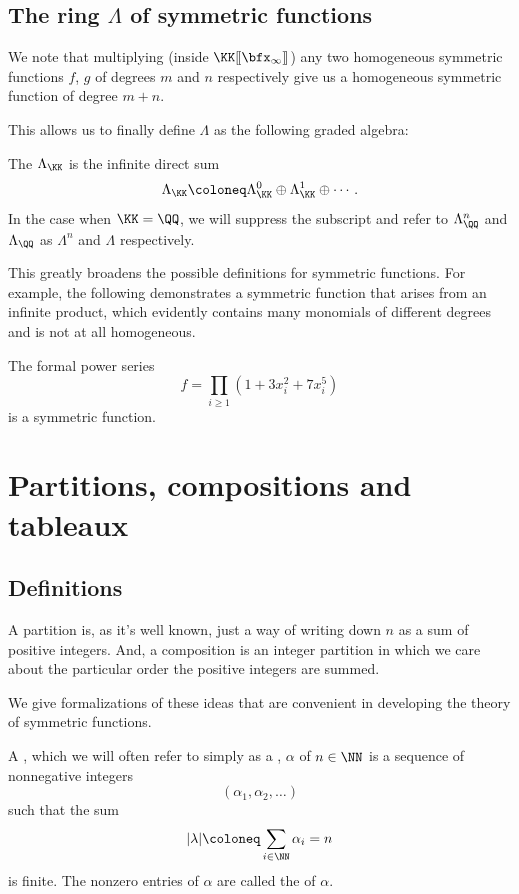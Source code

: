 \documentclass{article}
\newcommand{\lrBrack}[1]{[\kern-1.2pt[ {#1} ]\kern-1.2pt]}
\newcommand{\fps}[2]{#1 \lrBrack{#2}}
\begin{document}
\subsection{The ring \texorpdfstring{$\Lambda$}{Λ} of symmetric functions}

We note that multiplying (inside $\fps{\KK}{\bfx_\infty}$) any two homogeneous symmetric functions $f$, $g$ of degrees $m$ and $n$ respectively give us a homogeneous symmetric function of degree $m+n$.

This allows us to finally define $\Lambda$ as the following graded algebra:

\begin{definition}
    The  $\Lambda_\KK$ is the infinite direct sum
    \[
        \Lambda_\KK \coloneq \Lambda_\KK^0 \oplus\Lambda_\KK^1 \oplus \cdots.
    \]
    In the case when $\KK = \QQ$, we will suppress the subscript and refer to $\Lambda_\QQ^n$ and $\Lambda_\QQ$ as $\Lambda^n$ and $\Lambda$ respectively.
\end{definition}

This greatly broadens the possible definitions for symmetric functions. 
For example, the following demonstrates a symmetric function that arises from an infinite product, which evidently contains many monomials of different degrees and is not at all homogeneous.

\begin{example}
    The formal power series 
    \[
        f = \prod_{i\geq1} (1 + 3x_i^2 + 7x_i^5)
    \]
    is a symmetric function.
\end{example}

\section{Partitions, compositions and tableaux}

\subsection{Definitions}

A partition is, as it's well known, just a way of writing down $n$ as a sum of positive integers.
And, a composition is an integer partition in which we care about the particular order the positive integers are summed.

We give formalizations of these ideas that are convenient in developing the theory of symmetric functions.

\begin{definition}
    A , which we will often refer to simply as a , $\alpha$ of $n \in \NN$ is a sequence of nonnegative integers 
    \[
        (\alpha_1,\alpha_2,\ldots)
    \]
    such that the sum
    \[
        |\lambda|
        \coloneq
        \sum_{i\in\NN}
        \alpha_i
        =
        n
    \]
    is finite.
    The nonzero entries of $\alpha$ are called the  of $\alpha$.
\end{definition}
\end{document}
